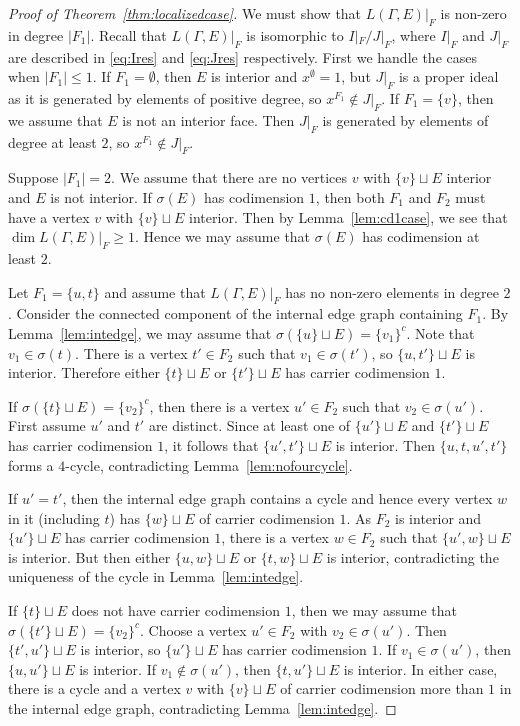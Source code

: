 \documentclass[ALCO, Unicode,published]{cedram}
\begin{document}
\begin{proof}[Proof of Theorem~\ref{thm:localizedcase}]
We must show that $L(\Gamma, E)|_{F}$ is non-zero in degree $|F_1|$. 
Recall that $L(\Gamma, E)|_{F}$ is isomorphic to $I|_{F}/J|_{F}$, where $I|_{F}$ and $J|_{F}$ are described in \eqref{eq:Ires} and \eqref{eq:Jres} respectively. First we handle the cases when $\vert F_1 \vert \le 1$. If $F_1 = \emptyset$, then $E$ is interior and $x^{\emptyset} = 1$, but $J|_{F}$ is a proper ideal as it is generated by elements of positive degree, so $x^{F_1} \not \in J|_{F}$. If $F_1 = \{v\}$, then we assume that $E$ is not an interior face. Then $J|_{F}$ is generated by elements of degree at least $2$, so $x^{F_1} \not \in J|_{F}$.

Suppose $\vert F_1 \vert = 2$. We assume that there are no vertices $v$ with $\{v\} \sqcup E$ interior and $E$ is not interior. If $\sigma(E)$ has codimension $1$, then both $F_1$ and $F_2$ must have a vertex $v$ with $\{v\} \sqcup E$ interior. Then by Lemma~\ref{lem:cd1case}, we see that $\dim L(\Gamma, E)|_{F} \ge 1$. Hence we may assume that $\sigma(E)$ has codimension at least $2$.

Let $F_1 = \{u, t\}$ and assume that $L(\Gamma, E)|_{F}$ has no non-zero elements in degree $2$. Consider the connected component of the internal edge graph containing $F_1$. By Lemma~\ref{lem:intedge}, we may assume that $\sigma(\{u\} \sqcup E) = \{v_1\}^c$. Note that $v_1 \in \sigma(t)$. There is a vertex $t' \in F_2$ such that $v_1 \in \sigma(t')$, so $\{u, t'\} \sqcup E$ is interior. Therefore either $\{t\} \sqcup E$ or $\{t'\} \sqcup E$ has carrier codimension $1$. 

If $\sigma(\{t\} \sqcup E) = \{v_2\}^c$, then there is a vertex $u' \in F_2$ such that $v_2 \in \sigma(u')$. First assume $u'$ and $t'$ are distinct. Since at least one of $\{u'\} \sqcup E$ and $\{t'\} \sqcup E$ has carrier codimension $1$, it follows that $\{ u', t'\} \sqcup E$ is interior. Then $\{u, t, u', t'\}$ forms a $4$-cycle, contradicting Lemma~\ref{lem:nofourcycle}.

If $u' = t'$, then the internal edge graph contains a cycle and hence every vertex $w$ in it (including $t$) has $\{w\} \sqcup E$ of carrier codimension $1$. As $F_2$ is interior and $\{u'\} \sqcup E$ has carrier codimension $1$, there is a vertex $w \in F_2$ such that $\{u', w\} \sqcup E$ is interior. But then either $\{u, w\} \sqcup E$ or $\{t, w\} \sqcup E$ is interior, contradicting the uniqueness of the cycle in Lemma~\ref{lem:intedge}.

If $\{t\} \sqcup E$ does not have carrier codimension $1$, then we may assume that $\sigma(\{t'\} \sqcup E) = \{v_2\}^c$. Choose a vertex $u' \in F_2$ with $v_2 \in \sigma(u')$. Then $\{t', u'\} \sqcup E$ is interior, so $\{u'\} \sqcup E$ has carrier codimension $1$. If $v_1 \in \sigma(u')$, then $\{u, u'\} \sqcup E$ is interior. If $v_1 \not \in \sigma(u')$, then $\{t, u'\} \sqcup E$ is interior. In either case, there is a cycle and a vertex $v$ with $\{v\} \sqcup E$ of carrier codimension more than $1$ in the internal edge graph, contradicting Lemma~\ref{lem:intedge}. 
\end{proof}
\end{document}

